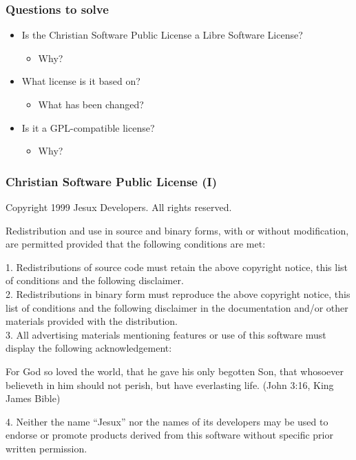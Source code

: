 \documentclass{beamer}
\begin{document}

\begin{frame}
\frametitle{Questions to solve}

\begin{itemize}
\item Is the Christian Software Public License a Libre Software
License?
	\begin{itemize}
	\item Why?
	\end{itemize}
\item What license is it based on?
\begin{itemize}
	\item What has been changed?
	\end{itemize}
\item Is it a GPL-compatible license?
	\begin{itemize}
	\item Why?
	\end{itemize}
\end{itemize}

\end{frame}




\begin{frame}
\frametitle{Christian Software Public License (I)}

\footnotesize

Copyright 1999 Jesux Developers. All rights reserved.

\medskip

Redistribution and use in source and binary forms, with or without
modification, are permitted provided that the following conditions are met:

\medskip

1. Redistributions of source code must retain the above copyright notice, this
list of conditions and the following disclaimer. \\
2. Redistributions in binary form must reproduce the above copyright notice,
this list of conditions and the following disclaimer in the documentation and/or
other materials provided with the distribution. \\
3. All advertising materials mentioning features or use of this software must
display the following acknowledgement: \\

\begin{center}
For God so loved the world, that he gave his only begotten Son, that
whosoever believeth in him should not perish, but have everlasting life. (John
3:16, King James Bible)
\end{center}

4. Neither the name ``Jesux'' nor the names of its developers may be used to
endorse or promote products derived from this software without specific prior
written permission.


\end{frame}
\end{document}

